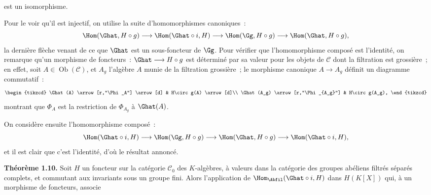 est un
isomorphisme.

Pour le voir qu'il est injectif, on utilise la suite d'homomorphismes canoniques~:
\[
  \Hom(\Ghat,H\circ g)\longrightarrow
  \Hom(\Ghat\circ i,H)\longrightarrow
  \Hom(\Gg,H\circ g)\longrightarrow
  \Hom(\Ghat,H\circ g),
\]
la dernière flèche venant de ce que \(\Ghat\) est un sous-foncteur de \(\Gg\). Pour vérifier que l'homomorphisme composé est l'identité, on remarque qu'un morphisme de foncteurs~: \(\Ghat\longrightarrow H\circ g\) est déterminé par sa valeur pour les objets de \(\mathcal C\) dont la filtration est grossière~; en effet, soit \(A\in\operatorname{Ob}(\mathcal C)\), et \(A_g\) l'algèbre \(A\) munie de la filtration grossière~; le morphisme canonique \(A\to A_g\) définit un diagramme commutatif~:
\[
\begin{tikzcd}
\Ghat(A) \arrow[r,"\Phi_A"] \arrow[d] &
H\circ g(A) \arrow[d]\\
\Ghat(A_g) \arrow[r,"\Phi_{A_g}"] &
H\circ g(A_g),
\end{tikzcd}
\]
montrant que \(\Phi_A\) est la restriction de \(\Phi_{A_g}\) à \(\Ghat(A)\).

On considère ensuite l'homomorphisme composé~:
\[
  \Hom(\Ghat\circ i,H)\longrightarrow
  \Hom(\Gg,H\circ g)\longrightarrow
  \Hom(\Ghat,H\circ g)\longrightarrow
  \Hom(\Ghat\circ i,H),
\]
et il est clair que c'est l'identité, d'où le résultat annoncé.

\textbf{Théorème 1.10.} Soit \(H\) un foncteur sur la catégorie \(\mathcal C_0\) des \(K\)-algèbres, à valeurs dans la catégorie des groupes abéliens filtrés séparés complets, et commutant aux invariants sous un groupe fini. Alors l'application de \(\Hom_{\Abfil}(\Ghat\circ i,H)\) dans \(H(K[X])\) qui, à un morphisme de foncteurs, associe
